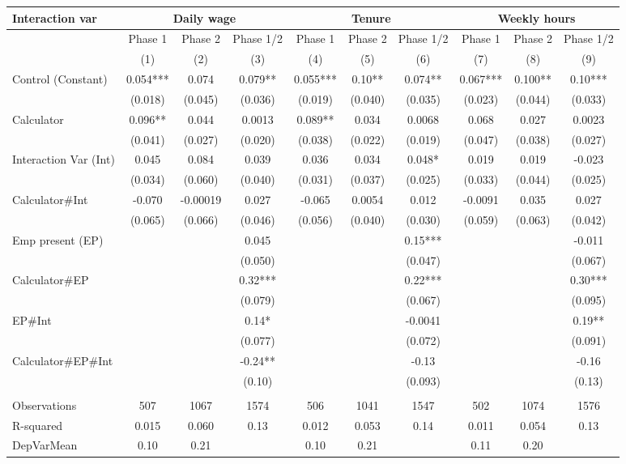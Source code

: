 \begin{tabular}{lccccccccc}
\toprule
Interaction var & \multicolumn{3}{c}{Daily wage} & \multicolumn{3}{c}{Tenure} & \multicolumn{3}{c}{Weekly hours} \\
\midrule
\midrule
      & Phase 1 & Phase 2 & Phase 1/2 & Phase 1 & Phase 2 & Phase 1/2 & Phase 1 & Phase 2 & Phase 1/2 \\
\midrule
      & (1)   & (2)   & (3)   & (4)   & (5)   & (6)   & (7)   & (8)   & (9) \\
\midrule
\midrule
Control (Constant) & 0.054*** & 0.074 & 0.079** & 0.055*** & 0.10** & 0.074** & 0.067*** & 0.100** & 0.10*** \\
      & (0.018) & (0.045) & (0.036) & (0.019) & (0.040) & (0.035) & (0.023) & (0.044) & (0.033) \\
Calculator & 0.096** & 0.044 & 0.0013 & 0.089** & 0.034 & 0.0068 & 0.068 & 0.027 & 0.0023 \\
      & (0.041) & (0.027) & (0.020) & (0.038) & (0.022) & (0.019) & (0.047) & (0.038) & (0.027) \\
Interaction Var (Int) & 0.045 & 0.084 & 0.039 & 0.036 & 0.034 & 0.048* & 0.019 & 0.019 & -0.023 \\
      & (0.034) & (0.060) & (0.040) & (0.031) & (0.037) & (0.025) & (0.033) & (0.044) & (0.025) \\
Calculator\#Int & -0.070 & -0.00019 & 0.027 & -0.065 & 0.0054 & 0.012 & -0.0091 & 0.035 & 0.027 \\
      & (0.065) & (0.066) & (0.046) & (0.056) & (0.040) & (0.030) & (0.059) & (0.063) & (0.042) \\
Emp present (EP) &       &       & 0.045 &       &       & 0.15*** &       &       & -0.011 \\
      &       &       & (0.050) &       &       & (0.047) &       &       & (0.067) \\
Calculator\#EP   &       &       & 0.32*** &       &       & 0.22*** &       &       & 0.30*** \\
      &       &       & (0.079) &       &       & (0.067) &       &       & (0.095) \\
EP\#Int &       &       & 0.14* &       &       & -0.0041 &       &       & 0.19** \\
      &       &       & (0.077) &       &       & (0.072) &       &       & (0.091) \\
Calculator\#EP\#Int &       &       & -0.24** &       &       & -0.13 &       &       & -0.16 \\
      &       &       & (0.10) &       &       & (0.093) &       &       & (0.13) \\
      &       &       &       &       &       &       &       &       &  \\
\midrule
Observations & 507   & 1067  & 1574  & 506   & 1041  & 1547  & 502   & 1074  & 1576 \\
R-squared & 0.015 & 0.060 & 0.13  & 0.012 & 0.053 & 0.14  & 0.011 & 0.054 & 0.13 \\
DepVarMean & 0.10  & 0.21  &       & 0.10  & 0.21  &       & 0.11  & 0.20  &  \\
\bottomrule
\bottomrule
\end{tabular}%
